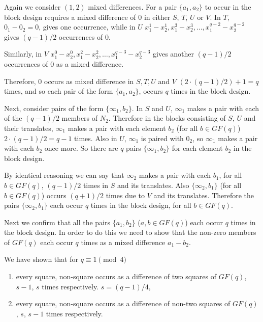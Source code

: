 \documentclass[
  11pt,
  a4paper]{book}
\begin{document}
Again we consider \((1, 2)\) mixed differences. For a pair
\(\{a_1, a_2\}\) to occur in the block design requires a mixed
difference of 0 in either \(S\), \(T\), \(U\) or \(V\). In \(T\),
\(0_1 - 0_2 = 0\), gives one occurrence, while in \(U\)
\(x_{1}^{1} - x_{2}^{1}, x_{1}^{3} - x_{2}^{3}, \ldots, x_{1}^{q - 2} - x_{2}^{q - 2}\)
gives \((q - 1)/2\) occurrences of 0.

Similarly, in \(V\)
\(x_{1}^{0} - x_{2}^{0}, x_{1}^{2} - x_{2}^{2}, \ldots, x_{1}^{q - 3} - x_{2}^{q - 3}\)
gives another \((q - 1)/2\) occurrences of 0 as a mixed difference.

Therefore, 0 occurs as mixed difference in \(S, T, U\) and \(V\)
\((2\cdot (q - 1)/2) + 1 = q\) times, and so each pair of the form
\(\{a_1, a_2\}\), occurs \(q\) times in the block design.

Next, consider pairs of the form \(\{\infty _1, b_2\}\). In \(S\) and
\(U\), \(\infty _1\) makes a pair with each of the \((q - 1)/2\) members
of \(N_2\). Therefore in the blocks consisting of \(S\), \(U\) and their
translates, \(\infty _1\) makes a pair with each element \(b_2\) (for
all \(b \in GF(q)\)) \(2 \cdot (q - 1)/2 = q - 1\) times. Also in \(U\),
\(\infty _1\) is paired with \(0_2\), so \(\infty _1\) makes a pair with
each \(b_2\) once more. So there are \(q\) pairs \(\{\infty _1, b_2\}\)
for each element \(b_2\) in the block design.

By identical reasoning we can say that \(\infty _2\) makes a pair with
each \(b_1\), for all \(b \in GF(q)\), \((q - 1)/2\) times in \(S\) and
its translates. Also \(\{\infty _2, b_1\}\) (for all \(b \in GF(q)\))
occurs \((q + 1)/2\) times due to \(V\) and its translates. Therefore
the pairs \(\{\infty _2, b_1 \}\) each occur \(q\) times in the block
design, for all \(b \in GF(q)\).

Next we confirm that all the pairs \(\{a_1, b_2\}\) (\(a, b \in GF(q)\))
each occur \(q\) times in the block design. In order to do this we need
to show that the non-zero members of \(GF(q)\) each occur \(q\) times as
a mixed difference \(a_1 - b_2\).

We have shown that for \(q \equiv 1\pmod 4\)

\begin{enumerate}
  \item{every square, non-square occurs as a difference of two
      squares of $GF(q)$, $s - 1$, $s$ times respectively.
      $s = (q - 1)/4$,}
  \item{every square, non-square occurs as a difference of
      non-two squares of $GF(q)$, $s$, $s - 1$ times
      respectively.}
\end{enumerate}
\end{document}
